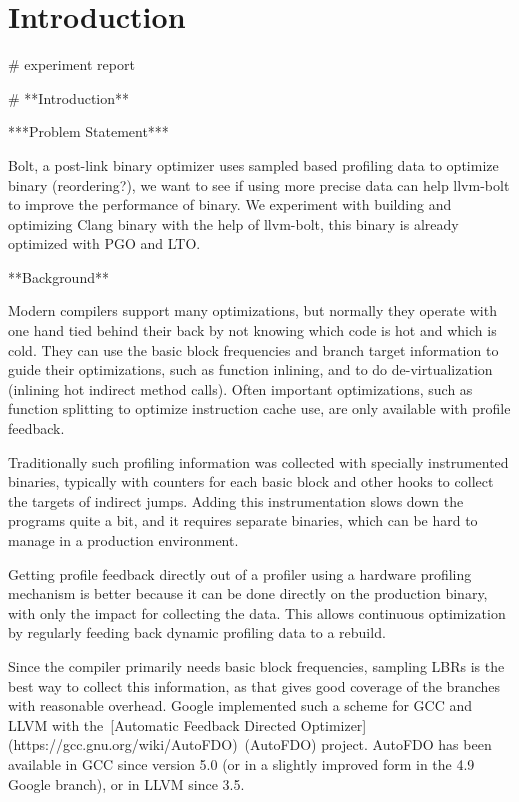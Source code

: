\endofdump

\maketitle

\begin{abstract}
\noindent
\end{abstract}


\section{Introduction}
# experiment report

# **Introduction**

***Problem Statement***

Bolt, a post-link binary optimizer uses sampled based profiling data to optimize binary (reordering?), we want to see if using more precise data can help llvm-bolt to improve the performance of binary. We experiment with building and optimizing Clang binary  with the help of llvm-bolt, this binary is already optimized with PGO and LTO.

**Background** 

Modern compilers support many optimizations, but normally they operate with one hand tied behind their back by not knowing which code is hot and which is cold. They can use the basic block frequencies and branch target information to guide their optimizations, such as function inlining, and to do de-virtualization (inlining hot indirect method calls). Often important optimizations, such as function splitting to optimize instruction cache use, are only available with profile feedback.

Traditionally such profiling information was collected with specially instrumented binaries, typically with counters for each basic block and other hooks to collect the targets of indirect jumps. Adding this instrumentation slows down the programs quite a bit, and it requires separate binaries, which can be hard to manage in a production environment.

Getting profile feedback directly out of a profiler using a hardware profiling mechanism is better because it can be done directly on the production binary, with only the impact for collecting the data. This allows continuous optimization by regularly feeding back dynamic profiling data to a rebuild.

Since the compiler primarily needs basic block frequencies, sampling LBRs is the best way to collect this information, as that gives good coverage of the branches with reasonable overhead. Google implemented such a scheme for GCC and LLVM with the [Automatic Feedback Directed Optimizer](https://gcc.gnu.org/wiki/AutoFDO) (AutoFDO) project. AutoFDO has been available in GCC since version 5.0 (or in a slightly improved form in the 4.9 Google branch), or in LLVM since 3.5.

